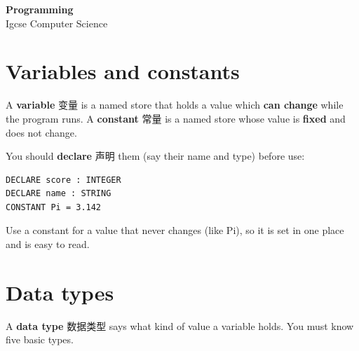 \documentclass[11pt]{article}
\begin{document}
\begin{center}
  {\LARGE\bfseries Programming}\\[0.35em]
  {\large Igcse Computer Science}
\end{center}
\vspace{0.6em}

\section*{Variables and constants}

A \textbf{variable} 变量 is a named store that holds a value which \textbf{can change} while the program runs. A \textbf{constant} 常量 is a named store whose value is \textbf{fixed} and does not change.

You should \textbf{declare} 声明 them (say their name and type) before use:

\begin{Verbatim}
DECLARE score : INTEGER
DECLARE name : STRING
CONSTANT Pi = 3.142
\end{Verbatim}

Use a constant for a value that never changes (like Pi), so it is set in one place and is easy to read.

\section*{Data types}

A \textbf{data type} 数据类型 says what kind of value a variable holds. You must know five basic types.

\begin{center}
\end{center}
\end{document}
